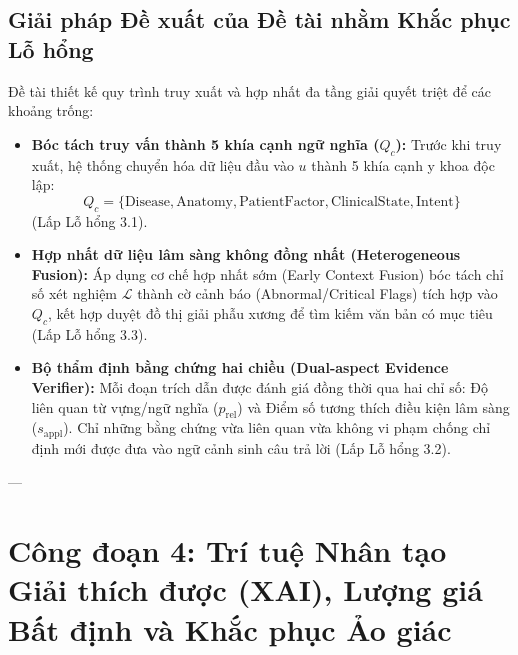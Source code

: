 \subsection{Giải pháp Đề xuất của Đề tài nhằm Khắc phục Lỗ hổng}
Đề tài thiết kế quy trình truy xuất và hợp nhất đa tầng giải quyết triệt để các khoảng trống:
\begin{itemize}
    \item \textbf{Bóc tách truy vấn thành 5 khía cạnh ngữ nghĩa ($Q_c$):} Trước khi truy xuất, hệ thống chuyển hóa dữ liệu đầu vào $u$ thành 5 khía cạnh y khoa độc lập:
    \begin{equation}
        Q_c = \{\text{Disease}, \text{Anatomy}, \text{PatientFactor}, \text{ClinicalState}, \text{Intent}\}
    \end{equation}
    (Lấp Lỗ hổng 3.1).
    \item \textbf{Hợp nhất dữ liệu lâm sàng không đồng nhất (Heterogeneous Fusion):} Áp dụng cơ chế hợp nhất sớm (Early Context Fusion) bóc tách chỉ số xét nghiệm $\mathcal{L}$ thành cờ cảnh báo (Abnormal/Critical Flags) tích hợp vào $Q_c$, kết hợp duyệt đồ thị giải phẫu xương để tìm kiếm văn bản có mục tiêu (Lấp Lỗ hổng 3.3).
    \item \textbf{Bộ thẩm định bằng chứng hai chiều (Dual-aspect Evidence Verifier):} Mỗi đoạn trích dẫn được đánh giá đồng thời qua hai chỉ số: Độ liên quan từ vựng/ngữ nghĩa ($p_{\mathrm{rel}}$) và Điểm số tương thích điều kiện lâm sàng ($s_{\mathrm{appl}}$). Chỉ những bằng chứng vừa liên quan vừa không vi phạm chống chỉ định mới được đưa vào ngữ cảnh sinh câu trả lời (Lấp Lỗ hổng 3.2).
\end{itemize}

---

\section{Công đoạn 4: Trí tuệ Nhân tạo Giải thích được (XAI), Lượng giá Bất định và Khắc phục Ảo giác}

